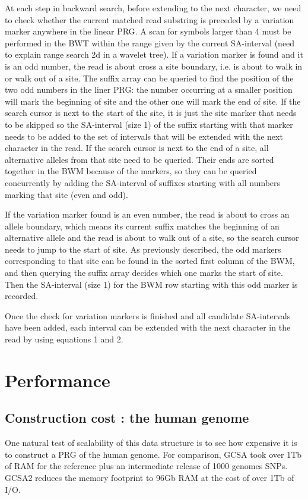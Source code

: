 \documentclass[runningheads,a4paper]{llncs}
\begin{document}
At each step in backward search, before extending to the next character, we need to check whether the current matched read substring is preceded by a variation marker anywhere in the linear PRG. A scan for symbols larger than 4 must be performed in the BWT within the range given by the current SA-interval (need to explain range search 2d in a wavelet tree). If a variation marker is found and it is an odd number, the read is about cross a site boundary, i.e. is about to walk in or walk out of a site. The suffix array can be queried to find the position of the two odd numbers in the liner PRG: the number occurring at a smaller position will mark the beginning of site and the other one will mark the end of site. If the search cursor is next to the start of the site, it is just the site marker that needs to be skipped so the SA-interval (size 1) of the suffix starting with that marker needs to be added to the set of intervals that will be extended with the next character in the read. If the search cursor is next to the end of a site, all alternative alleles from that site need to be queried. Their ends are sorted together in the BWM because of the markers, so they can be queried concurrently by adding the SA-interval of suffixes starting with all numbers marking that site (even and odd). 

If the variation marker found is an even number, the read is about to cross an allele boundary, which means its current suffix matches the beginning of an alternative allele and the read is about to walk out of a site, so the search cursor needs to jump to the start of site. As previously described, the odd markers corresponding to that site can be found in the sorted first column of the BWM, and then querying the suffix array decides which one marks the start of site. Then the SA-interval (size 1) for the BWM row starting with this odd marker is recorded.

Once the check for variation markers is finished and all candidate SA-intervals have been added, each interval can be extended with the next character in the read by using equations 1 and 2.

\section{Performance}
\subsection{Construction cost : the human genome}
One natural test of scalability of this data structure is to see how expensive it is to construct a PRG of the human genome. For comparison, GCSA took over 1Tb of RAM for the reference plus an intermediate release of 1000 genomes SNPs. GCSA2 reduces the memory footprint to 96Gb RAM at the cost of over 1Tb of I/O. 
\end{document}
